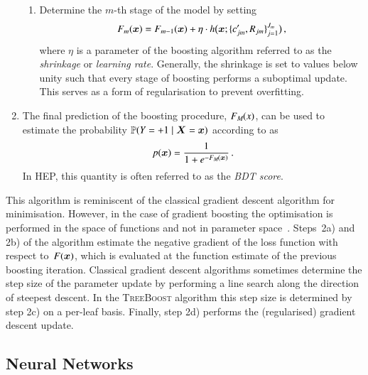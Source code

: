 \begin{enumerate}[itemsep=2pt]
\begin{enumerate}[itemsep=2pt]
  \item Determine the $m$-th stage of the model by setting
    \begin{align*}
      F_m(\bm{x}) = F_{m - 1}(\bm{x})
      + \eta \cdot h\bigl( \bm{x}; \{c_{jm}^\prime, R_{jm}\}_{j=1}^{J_{m}} \bigr)
      \,\text{,}
    \end{align*}
    where $\eta$ is a parameter of the boosting algorithm referred to as the
    \emph{shrinkage} or \emph{learning rate}. Generally, the shrinkage is set to
    values below unity such that every stage of boosting performs a suboptimal
    update. This serves as a form of regularisation to prevent overfitting.

  \end{enumerate}

\item The final prediction of the boosting procedure,
  $F_{M\hspace{-0.07em}}(x)$, can be used to estimate the probability
  $\mathbb{P}(Y = +1 \mid \bm{X} = \bm{x})$ according to
   as
  \begin{align*}
    p(\bm{x}) = \frac{1}{1 + e^{-F_{M\hspace{-0.07em}}(\bm{x})}} \,\text{.}
  \end{align*}
  In HEP, this quantity is often referred to as the \emph{BDT score}.

\end{enumerate}
This algorithm is reminiscent of the classical gradient descent algorithm for
minimisation. However, in the case of gradient boosting the optimisation is
performed in the space of functions and not in parameter
space~\cite{Friedman:2001wbq}. Steps~2a) and 2b) of the algorithm estimate the
negative gradient of the loss function with respect to~$F(\bm{x})$, which is
evaluated at the function estimate of the previous boosting iteration. Classical
gradient descent algorithms sometimes determine the step size of the parameter
update by performing a line search along the direction of steepest descent. In
the \textsc{TreeBoost} algorithm this step size is determined by step 2c) on a
per-leaf basis.
Finally, step 2d) performs the (regularised) gradient descent update.


\subsection{Neural Networks}%
\label{sec:neural_networks}

